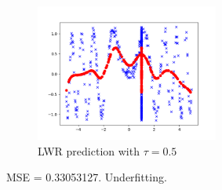 \begin{answer}
    \begin{figure}[htbp]
        \centering
        \begin{minipage}[t]{0.48\textwidth}
        \centering
        \includegraphics[width=6cm]{../src/output/p05b.png}
        \caption{LWR prediction with $\tau = 0.5$}
        \end{minipage}
    \end{figure}
    
    MSE = 0.33053127. Underfitting.
\end{answer}
